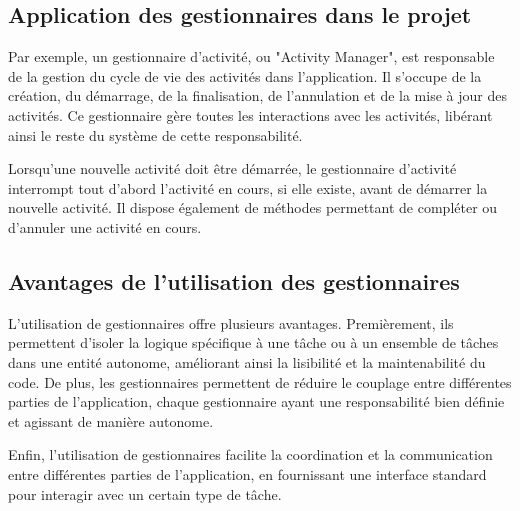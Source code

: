 \subsection{Application des gestionnaires dans le projet}

Par exemple, un gestionnaire d'activité, ou "Activity Manager", est responsable de la gestion du cycle de vie des activités dans l'application. Il s'occupe de la création, du démarrage, de la finalisation, de l'annulation et de la mise à jour des activités. Ce gestionnaire gère toutes les interactions avec les activités, libérant ainsi le reste du système de cette responsabilité.

Lorsqu'une nouvelle activité doit être démarrée, le gestionnaire d'activité interrompt tout d'abord l'activité en cours, si elle existe, avant de démarrer la nouvelle activité. Il dispose également de méthodes permettant de compléter ou d'annuler une activité en cours.

\subsection{Avantages de l'utilisation des gestionnaires}

L'utilisation de gestionnaires offre plusieurs avantages. Premièrement, ils permettent d'isoler la logique spécifique à une tâche ou à un ensemble de tâches dans une entité autonome, améliorant ainsi la lisibilité et la maintenabilité du code. De plus, les gestionnaires permettent de réduire le couplage entre différentes parties de l'application, chaque gestionnaire ayant une responsabilité bien définie et agissant de manière autonome.

Enfin, l'utilisation de gestionnaires facilite la coordination et la communication entre différentes parties de l'application, en fournissant une interface standard pour interagir avec un certain type de tâche.